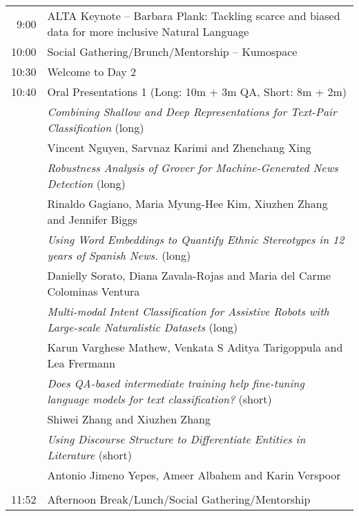 \begin{longtable}{rl}
9:00 &  ALTA Keynote – Barbara Plank: Tackling scarce and biased data for more inclusive Natural Language\\
10:00 &   Social Gathering/Brunch/Mentorship – Kumospace \\
10:30 &  Welcome to Day 2\\
10:40 &   Oral Presentations 1 (Long: 10m + 3m QA, Short: 8m + 2m) \\
&  \emph{Combining Shallow and Deep Representations for Text-Pair Classification} (long) \\
&  \hspace{.25cm} Vincent Nguyen, Sarvnaz Karimi and Zhenchang Xing \\
&  \emph{Robustness Analysis of Grover for Machine-Generated News Detection} (long)\\
&  \hspace{.25cm} Rinaldo Gagiano, Maria Myung-Hee Kim, Xiuzhen Zhang and Jennifer Biggs\\
&  \emph{Using Word Embeddings to Quantify Ethnic Stereotypes in 12 years of Spanish News.} (long)\\
&  \hspace{.25cm} Danielly Sorato, Diana Zavala-Rojas and Maria del Carme Colominas Ventura \\
&  \emph{Multi-modal Intent Classification for Assistive Robots with Large-scale Naturalistic Datasets} (long) \\
&  \hspace{.25cm} Karun Varghese Mathew, Venkata S Aditya Tarigoppula and Lea Frermann \\
&  \emph{Does QA-based intermediate training help fine-tuning language models for text classification?} (short) \\
&  \hspace{.25cm}Shiwei Zhang and Xiuzhen Zhang\\
&  \emph{Using Discourse Structure to Differentiate Entities in Literature} (short) \\
&  \hspace{.25cm}Antonio Jimeno Yepes, Ameer Albahem and Karin Verspoor\\ \\

11:52 &  Afternoon Break/Lunch/Social Gathering/Mentorship\\


\end{longtable}
